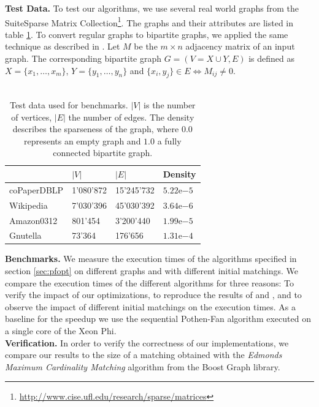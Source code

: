 \documentclass[letterpaper]{article}
\newcommand{\mypar}[1]{{\bf #1.}}
\begin{document}
\mypar{Test Data}
To test our algorithms, we use several real world graphs from the SuiteSparse Matrix Collection\footnote{\url{http://www.cise.ufl.edu/research/sparse/matrices}}.
The graphs and their attributes are listed in table \ref{table:testdata}. 
To convert regular graphs to bipartite graphs, we applied the same technique as described in \cite{Azad:2015}. 
Let $M$ be the $m \times n$ adjacency matrix of an input graph. 
The corresponding bipartite graph $G = (V = X \cup Y, E)$ is defined as $X = \{x_1, \dots, x_m\}$, $Y = \{y_1, \dots, y_n\}$ and $\{x_i, y_j\} \in E \iff M_{ij} \neq 0$.\\


\\
\begin{table}
\centering
\begin{tabular}{ |l|l|l|l| }
\hline
 & $\lvert V \rvert$ & $\lvert E \rvert$ & Density \\ \hline
coPaperDBLP & 1'080'872 & 15'245'732 & $5.22\mathrm{e}{-5}$ \\ \hline
Wikipedia & 7'030'396 & 45'030'392 & $3.64\mathrm{e}{-6}$ \\ \hline
Amazon0312 & 801'454 & 3'200'440 & $1.99\mathrm{e}{-5}$ \\ \hline
Gnutella & 73'364 & 176'656 & $1.31\mathrm{e}{-4}$ \\ \hline
\end{tabular}
\caption{Test data used for benchmarks. $\lvert V \rvert$ is the number of vertices, $\lvert E \rvert$ the number of edges. The density describes the sparseness of the graph, where $0.0$ represents an empty graph and $1.0$ a fully connected bipartite graph.}
\label{table:testdata}
\end{table}

\mypar{Benchmarks}
We measure the execution times of the algorithms specified in section \ref{sec:pfopt} on different graphs and with different initial matchings. We compare the execution times of the different algorithms for three reasons: To verify the impact of our optimizations, to reproduce the results of \cite{Azad:2012} and \cite{Azad:2015}, and to observe the impact of different initial matchings on the execution times. As a baseline for the speedup we use the sequential Pothen-Fan algorithm executed on a single core of the Xeon Phi.\\

\mypar{Verification}
In order to verify the correctness of our implementations, we compare our results to the size of a matching obtained with the \textit{Edmonds Maximum Cardinality Matching} algorithm \cite{BoostEdmonds} from the Boost Graph library.\\
\end{document}
